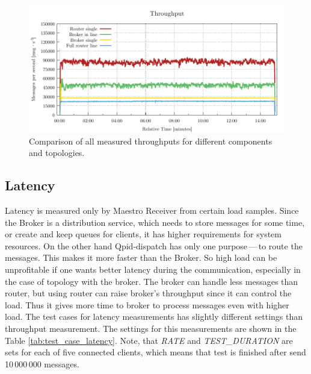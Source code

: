 \begin{figure}[H]
	\centering
	\includegraphics[width=1\linewidth]{obrazky-figures/charts/basic-throughput.pdf}
	\caption{Comparison of all measured throughputs for different components and topologies.}
	\label{fig:basic-throughput-comparison}
\end{figure}


\subsection{Latency}
\label{Latency}
Latency is measured only by Maestro Receiver from certain load samples. Since the Broker is a distribution service, which needs to store messages for some time, or create and keep queues for clients, it has higher requirements for system resources. On the other hand Qpid-dispatch has only one purpose\,---\,to route the messages. This makes it more faster than the Broker. So high load can be unprofitable if one wants better latency during the communication, especially in the case of topology with the broker. The broker can handle less messages than router, but using router can raise broker's throughput since it can control the load. Thus it gives more time to broker to process messages even with higher load. The test cases for latency measurements has slightly different settings than throughput measurement. The settings for this measurements are shown in the Table \ref{tab:test_case_latency}. Note, that \emph{RATE} and \emph{TEST\_DURATION} are sets for each of five connected clients, which means that test is finished after send 10\,000\,000 messages.

